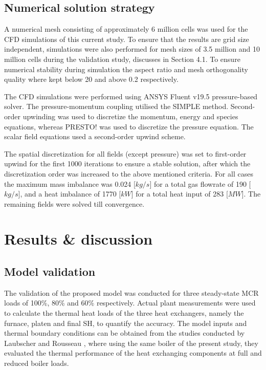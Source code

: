 \documentclass[11pt,cleanfoot]{asme2ej}
\begin{document}
\subsection{Numerical solution strategy}\label{sec_num_sol}
A numerical mesh consisting of approximately 6 million cells was used for the CFD simulations of this current study. To ensure that the results are grid size independent, simulations were also performed for mesh sizes of 3.5 million and 10 million cells during the validation study, discusses in Section 4.1. To ensure numerical stability during simulation the aspect ratio and mesh orthogonality quality where kept below 20 and above 0.2 respectively. %

The CFD simulations were performed using ANSYS Fluent v19.5\textsuperscript{\textregistered} pressure-based solver. The pressure-momentum coupling utilised the SIMPLE method. Second-order upwinding was used to discretize the momentum, energy and species equations, whereas PRESTO! was used to discretize the pressure equation. The scalar field equations used a second-order upwind scheme.

The spatial discretization for all fields (except pressure) was set to first-order upwind for the first 1000 iterations to ensure a stable solution, after which the discretization order was increased to the above mentioned criteria. For all cases the maximum mass imbalance was 0.024 [$kg/s$] for a total gas flowrate of 190 [$kg/s$], and a heat imbalance of 1770 [$kW$] for a total heat input of 283 [$MW$]. The remaining fields were solved till convergence.

\section{Results \& discussion}
\subsection{Model validation}\label{sec_model_valid}
The validation of the proposed model was conducted for three steady-state MCR loads of 100\%, 80\% and 60\% respectively. Actual plant measurements were used to calculate the thermal heat loads of the three heat exchangers, namely the furnace, platen and final SH, to quantify the accuracy. The model inputs and thermal boundary conditions can be obtained from the studies conducted by Laubscher and Rousseau \cite{Laubscher2019b, Laubscher2020b}, where using the same boiler of the present study, they evaluated the thermal performance of the heat exchanging components at full and reduced boiler loads.
\end{document}
